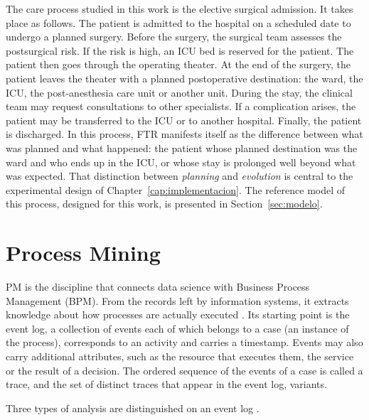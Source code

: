 The care process studied in this work is the elective surgical admission. It takes place as follows. The patient is admitted to the hospital on a scheduled date to undergo a planned surgery. Before the surgery, the surgical team assesses the postsurgical risk. If the risk is high, an ICU bed is reserved for the patient. The patient then goes through the operating theater. At the end of the surgery, the patient leaves the theater with a planned postoperative destination: the ward, the ICU, the post-anesthesia care unit or another unit. During the stay, the clinical team may request consultations to other specialists. If a complication arises, the patient may be transferred to the ICU or to another hospital. Finally, the patient is discharged. In this process, FTR manifests itself as the difference between what was planned and what happened: the patient whose planned destination was the ward and who ends up in the ICU, or whose stay is prolonged well beyond what was expected. That distinction between \emph{planning} and \emph{evolution} is central to the experimental design of Chapter~\ref{cap:implementacion}. The reference model of this process, designed for this work, is presented in Section~\ref{sec:modelo}.

\section{Process Mining}
\label{sec:pm}

PM is the discipline that connects data science with Business Process Management (BPM). From the records left by information systems, it extracts knowledge about how processes are actually executed \cite{aalst2016}. Its starting point is the event log, a collection of events each of which belongs to a case (an instance of the process), corresponds to an activity and carries a timestamp. Events may also carry additional attributes, such as the resource that executes them, the service or the result of a decision. The ordered sequence of the events of a case is called a trace, and the set of distinct traces that appear in the event log, variants.

Three types of analysis are distinguished on an event log \cite{aalst2016}.

